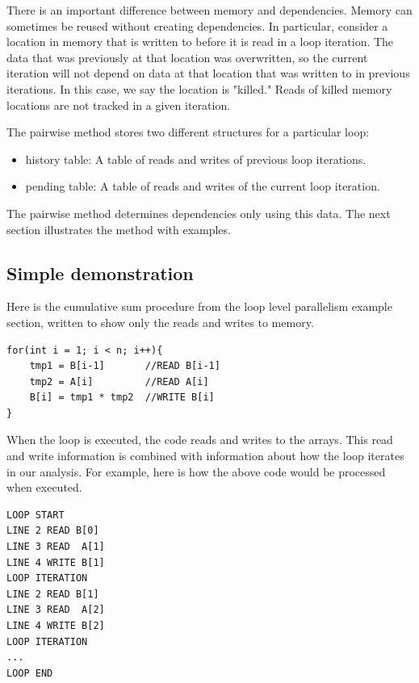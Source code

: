 \documentclass[12pt,twoside]{reedthesis}
\begin{document}
		There is an important difference between memory and dependencies. Memory can sometimes be reused without creating dependencies. In particular, consider a location in memory that is written to before it is read in a loop iteration. The data that was previously at that location was overwritten, so the current iteration will not depend on data at that location that was written to in previous iterations. In this case, we say the location is "killed." Reads of killed memory locations are not tracked in a given iteration.
		
		The pairwise method stores two different structures for a particular loop:
		
		\begin{itemize}
			\item history table: A table of reads and writes of previous loop iterations.
			\item pending table: A table of reads and writes of the current loop iteration.
		\end{itemize}
	
		The pairwise method determines dependencies only using this data. The next section illustrates the method with examples. 
		
		\subsection{Simple demonstration}
		
		
		Here is the cumulative sum procedure from the loop level parallelism example section, written to show only the reads and writes to memory.
			\begin{lstlisting}
for(int i = 1; i < n; i++){
	tmp1 = B[i-1]		//READ B[i-1]
	tmp2 = A[i] 		//READ A[i]
	B[i] = tmp1 * tmp2	//WRITE B[i]
}
			\end{lstlisting}
		
		When the loop is executed, the code reads and writes to the arrays. This read and write information is combined with information about how the loop iterates in our analysis. For example, here is how the above code would be processed when executed. 
		
		\begin{lstlisting}
LOOP START
LINE 2 READ B[0]
LINE 3 READ  A[1]
LINE 4 WRITE B[1]
LOOP ITERATION
LINE 2 READ B[1]
LINE 3 READ  A[2]
LINE 4 WRITE B[2]
LOOP ITERATION
...
LOOP END
		\end{lstlisting}
		
\end{document}
